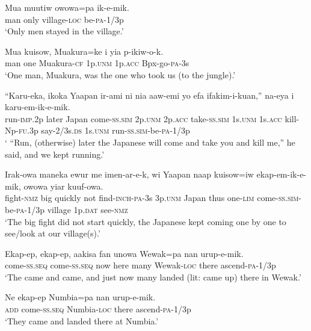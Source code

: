 \ea
\gll  Mua  muutiw  owowa=pa  ik-e-mik. \\
man  only  village-\textsc{loc}  be-\textsc{pa}-1/3p \\
\glt ‘Only men stayed in the village.’ \\
\z


\ea
\gll  Mua  kuisow,  Muakura=ke  i  yia  p-ikiw-o-k. \\
man  one  Muakura-\textsc{cf}  1p.\textsc{unm}  1p.\textsc{acc}  Bpx-go-\textsc{pa}-3s \\
\glt ‘One man, Muakura, was the one who took us (to the jungle).’ \\
\z


\ea
\gll  “Karu-eka,  ikoka  Yaapan  ir-ami  ni  nia  aaw-emi  yo  efa  ifakim-i-kuan,”  na-eya i  karu-em-ik-e-mik. \\
run-\textsc{imp}.2p  later  Japan  come-\textsc{ss}.\textsc{sim}  2p.\textsc{unm}  2p.\textsc{acc}   take-\textsc{ss}.\textsc{sim}  1s.\textsc{unm}  1s.\textsc{acc}  kill-Np-\textsc{fu}.3p  say-2/3s.\textsc{ds} 1s.\textsc{unm}  run-\textsc{ss}.\textsc{sim}-be-\textsc{pa}-1/3p \\
\glt ‘ “Run, (otherwise) later the Japanese will come and take you and kill me,” he said, and we kept running.’ \\
\z


\ea
\gll  Irak-owa  maneka  ewur  me  imen-ar-e-k,      wi  Yaapan  naap  kuisow=iw  ekap-em-ik-e-mik, owowa  yiar  kuuf-owa. \\  
fight-\textsc{nmz}  big  quickly  not  find-\textsc{inch}-\textsc{pa}-3s 3p.\textsc{unm}  Japan  thus  one-\textsc{lim}  come-\textsc{ss}.\textsc{sim}-be-\textsc{pa}-1/3p village  1p.\textsc{dat}  see-\textsc{nmz} \\ 
\glt ‘The big fight did not start quickly, the Japanese kept coming one by one to see/look at our village(s).’ \\
\z


\ea
\gll  Ekap-ep,  ekap-ep,  aakisa  fan  unowa  Wewak=pa  nan  urup-e-mik. \\
come-\textsc{ss.seq}  come-\textsc{ss.seq}  now  here  many  Wewak-\textsc{loc} there  ascend-\textsc{pa}-1/3p \\
\glt ‘The came and came, and just now many landed (lit: came up) there in Wewak.’ \\
\z


\ea
\gll  Ne  ekap-ep  Numbia=pa  nan  urup-e-mik. \\
\textsc{add}  come{}-\textsc{ss.seq}  Numbia-\textsc{loc}  there  ascend-\textsc{pa}-1/3p \\
\glt ‘They came and landed there at Numbia.’ \\
\z


